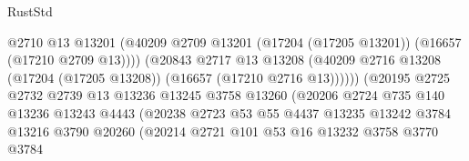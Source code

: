 \begin{lexlean}{RustStd}
\begin{coremodule}
                                          @2710
                                          @13
                                          @13201
                                          (@40209
                                            @2709
                                            @13201
                                            (@17204 (@17205 @13201))
                                            (@16657 (@17210 @2709 @13))))
                                        (@20843
                                          @2717
                                          @13
                                          @13208
                                          (@40209
                                            @2716
                                            @13208
                                            (@17204 (@17205 @13208))
                                            (@16657 (@17210 @2716 @13))))))
                                    (@20195
                                      @2725
                                      @2732
                                      @2739
                                      @13
                                      @13236
                                      @13245
                                      @3758
                                      @13260
                                      (@20206
                                        @2724
                                        @735
                                        @140
                                        @13236
                                        @13243
                                        @4443
                                        (@20238
                                          @2723
                                          @53
                                          @55
                                          @4437
                                          @13235
                                          @13242
                                          @3784
                                          @13216
                                          @3790
                                          @20260
                                          (@20214
                                            @2721
                                            @101
                                            @53
                                            @16
                                            @13232
                                            @3758
                                            @3770
                                            @3784

\end{coremodule}
\end{lexlean}
